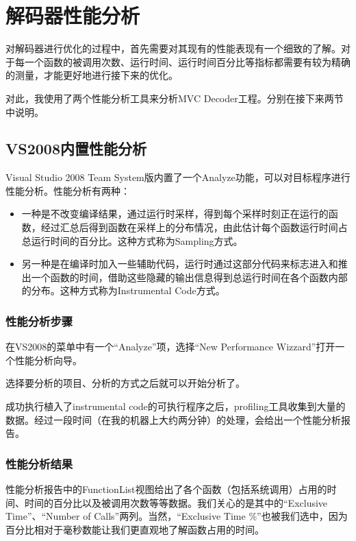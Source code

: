 \section{解码器性能分析}
\label{sec:decoderprofiling}

对解码器进行优化的过程中，首先需要对其现有的性能表现有一个细致的了解。对于每一个函数的被调用次数、运行时间、运行时间百分比等指标都需要有较为精确的测量，才能更好地进行接下来的优化。

对此，我使用了两个性能分析工具来分析MVC Decoder工程。分别在接下来两节中说明。

\subsection{VS2008内置性能分析}
\label{subsec:vsprofiling}
Visual Studio 2008 Team System版内置了一个Analyze功能，可以对目标程序进行性能分析。性能分析有两种：
\begin{itemize}
\item 一种是不改变编译结果，通过运行时采样，得到每个采样时刻正在运行的函数，经过汇总后得到函数在采样上的分布情况，由此估计每个函数运行时间占总运行时间的百分比。这种方式称为Sampling方式。
\item 另一种是在编译时加入一些辅助代码，运行时通过这部分代码来标志进入和推出一个函数的时间，借助这些隐藏的输出信息得到总运行时间在各个函数内部的分布。这种方式称为Instrumental Code方式。
\end{itemize}

\subsubsection{性能分析步骤}
\label{subsubsec:profilingprocess}

在VS2008的菜单中有一个“Analyze”项，选择“New Performance Wizzard”打开一个性能分析向导。

选择要分析的项目、分析的方式之后就可以开始分析了。

成功执行植入了instrumental code的可执行程序之后，profiling工具收集到大量的数据。经过一段时间（在我的机器上大约两分钟）的处理，会给出一个性能分析报告。

\subsubsection{性能分析结果}
\label{subsubsec:reportexerpt}

性能分析报告中的FunctionList视图给出了各个函数（包括系统调用）占用的时间、时间的百分比以及被调用次数等等数据。我们关心的是其中的“Exclusive Time”、“Number of Calls”两列。当然，“Exclusive Time \%”也被我们选中，因为百分比相对于毫秒数能让我们更直观地了解函数占用的时间。


